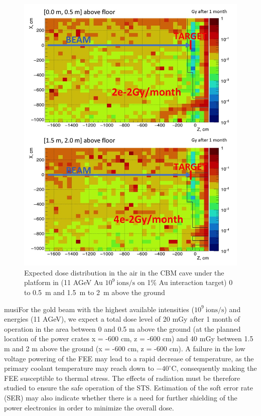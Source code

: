 \begin{figure}[!h]
    \centering
    \includegraphics[width=0.55\columnwidth]{Chapter4/images/Dose00.jpg}
    \caption{Expected dose distribution in the air in the \gls{CBM}
cave under the platform in (11 AGeV Au $10^{9} \mathrm{\ ions/s}$ on 1\% Au
interaction target) 0 to 0.5 m and 1.5 m to 2 m above the ground} 
    \label{fig:mCBM}
\end{figure}

musiFor the gold beam with the highest available intensities ($10^{9}\mathrm{\ ions/s}$) and energies (11 AGeV), we expect a total dose level of 20 mGy after 1 month of operation in the area between 0 and 0.5 m above the ground (at the planned location of the power crates x = -600 cm, z = -600 cm) and 40 mGy between 1.5 m and 2 m above the ground (x = -600 cm, z = -600 cm). A failure in the low voltage powering of the FEE may lead to a rapid decrease of temperature, as the primary coolant temperature may reach down to $-40^{\circ}\mathrm{C}$, consequently making the FEE susceptible to thermal stress. The effects of radiation must be therefore studied to ensure the safe operation of the STS. Estimation of the soft error rate (\gls{SER}) may also indicate whether there is a need for further shielding of the power electronics in order to minimize the overall dose.


